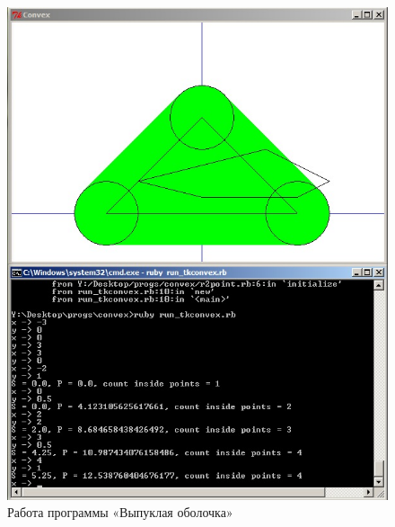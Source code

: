 \begin{figure}[ht!]
\begin{center}
\includegraphics[width=0.8\hsize]{images/screen1}
\end{center}
\caption{Работа программы «Выпуклая оболочка»}
\end{figure}












